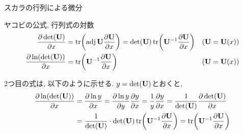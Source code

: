 \documentclass[dvipdfmx,notheorems,t]{beamer}
\begin{document}
\begin{frame}{スカラの行列による微分}
\begin{block}{ヤコビの公式, 行列式の対数}
  \begin{align*}
    \pdv{\det(\vb{U})}{x} &= \tr(\operatorname{adj} \vb{U} \pdv{\vb{U}}{x})
      = \det(\vb{U}) \tr(\vb{U}^{-1} \pdv{\vb{U}}{x})
      & \text{($\vb{U} = \vb{U}(x)$)} \\
    \pdv{\ln(\det(\vb{U}))}{x} &= \tr(\vb{U}^{-1} \pdv{\vb{U}}{x})
      & \text{($\vb{U} = \vb{U}(x)$)}
  \end{align*}
\end{block}

2つ目の式は, 以下のように示せる.
$y = \det(\vb{U})$とおくと,
\begin{align*}
  \pdv{\ln(\det(\vb{U}))}{x} &= \pdv{\ln y}{x} = \pdv{\ln y}{y} \pdv{y}{x} = \frac{1}{y} \pdv{y}{x}
    = \frac{1}{\det(\vb{U})} \pdv{\det(\vb{U})}{x} \\
    &= \frac{1}{\det(\vb{U})} \cdot \det(\vb{U}) \tr(\vb{U}^{-1} \pdv{\vb{U}}{x})
    = \tr(\vb{U}^{-1} \pdv{\vb{U}}{x})
\end{align*}
\end{frame}
\end{document}
